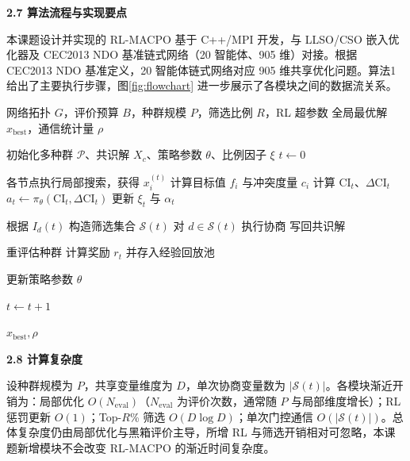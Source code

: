 \par
\indent
\textbf{2.7 算法流程与实现要点}
\par
本课题设计并实现的 RL-MACPO 基于 C++/MPI 开发，与 LLSO/CSO 嵌入优化器及 CEC2013 NDO 基准链式网络（20 智能体、905 维）对接。根据 CEC2013 NDO 基准定义，20 智能体链式网络对应 905 维共享优化问题。算法1 给出了主要执行步骤，图\ref{fig:flowchart} 进一步展示了各模块之间的数据流关系。

\par
\indent
\begin{center}
\begin{minipage}{0.6\linewidth}
\begin{algorithm}[H]
\caption{RL-MACPO 主流程}
\label{alg:rlmacpo}
\small
\begin{algorithmic}[1]
\REQUIRE 网络拓扑 $G$，评价预算 $B$，种群规模 $P$，筛选比例 $R$，RL 超参数
\ENSURE 全局最优解 $x_{\mathrm{best}}$，通信统计量 $\rho$

\STATE 初始化多种群 $\mathcal{P}$、共识解 $X_c$、策略参数 $\theta$、比例因子 $\xi$
\STATE $t\leftarrow0$


    \STATE 各节点执行局部搜索，获得 $x_i^{(t)}$
    \STATE 计算目标值 $f_i$ 与冲突度量 $c_i$
    \STATE 计算 $\mathrm{CI}_t$、$\Delta\mathrm{CI}_t$
    \STATE $a_t\leftarrow\pi_\theta(\mathrm{CI}_t,\Delta\mathrm{CI}_t)$
    \STATE 更新 $\xi_t$ 与 $\alpha_t$

        \STATE 根据 $I_d(t)$ 构造筛选集合 $\mathcal{S}(t)$
        \STATE 对 $d\in\mathcal{S}(t)$ 执行协商
        \STATE 写回共识解
    \ENDIF

    \STATE 重评估种群
    \STATE 计算奖励 $r_t$ 并存入经验回放池

        \STATE 更新策略参数 $\theta$
    \ENDIF

    \STATE $t\leftarrow t+1$

\ENDWHILE

\RETURN $x_{\mathrm{best}},\rho$
\end{algorithmic}
\end{algorithm}
\end{minipage}
\end{center}


\par
\indent
\textbf{2.8 计算复杂度}
\par
设种群规模为 $P$，共享变量维度为 $D$，单次协商变量数为 $|\mathcal{S}(t)|$。各模块渐近开销为：局部优化 $O(N_{\mathrm{eval}})$（$N_{\mathrm{eval}}$ 为评价次数，通常随 $P$ 与局部维度增长）；RL 惩罚更新 $O(1)$；Top-$R$\% 筛选 $O(D\log D)$；单次门控通信 $O(|\mathcal{S}(t)|)$。总体复杂度仍由局部优化与黑箱评价主导，所增 RL 与筛选开销相对可忽略，本课题新增模块不会改变 RL-MACPO 的渐近时间复杂度。


